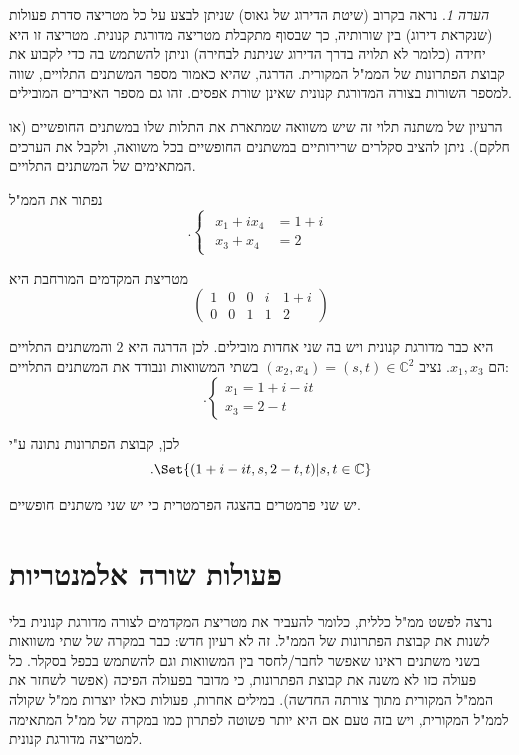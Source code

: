 \documentclass[
  hebrew,
  12pt,
  a4paper,
  oneside]{book}
\theoremstyle{definition}
\theoremstyle{remark}
\theoremstyle{plain}
\theoremstyle{remark}
\newtheorem*{remark}{הערה}
\begin{document}
\begin{remark}
נראה בקרוב (שיטת הדירוג של גאוס) שניתן לבצע על כל מטריצה סדרת פעולות
(שנקראת דירוג) בין שורותיה, כך שבסוף מתקבלת מטריצה מדורגת קנונית. מטריצה
זו היא יחידה (כלומר לא תלויה בדרך הדירוג שניתנת לבחירה) וניתן להשתמש בה
כדי לקבוע את קבוצת הפתרונות של הממ"ל המקורית. הדרגה, שהיא כאמור מספר
המשתנים התלויים, שווה למספר השורות בצורה המדורגת קנונית שאינן שורת
אפסים. זהו גם מספר האיברים המובילים.
\end{remark}

הרעיון של משתנה תלוי זה שיש משוואה שמתארת את התלות שלו במשתנים החופשיים
(או חלקם). ניתן להציב סקלרים שרירותיים במשתנים החופשיים בכל משוואה,
ולקבל את הערכים המתאימים של המשתנים התלויים.

\begin{example}

נפתור את הממ"ל \[.\begin{cases}
\begin{aligned}
x_1+ix_4&=1+i\\
x_3+x_4&=2
\end{aligned}
\end{cases}\]

מטריצת המקדמים המורחבת היא \[\left( \begin{array}{cccc|c}
    1 & 0 & 0 & i & 1+i\\
    0 & 0 & 1 & 1 & 2
\end{array} \right)\]

היא כבר מדורגת קנונית ויש בה שני אחדות מובילים. לכן הדרגה היא \(2\)
והמשתנים התלויים הם \(x_1,x_3\). נציב
\((x_2,x_4)=(s,t)\in\mathbb C^{2}\) בשתי המשוואות ונבודד את המשתנים
התלויים: \[.\begin{cases}
x_1=1+i-it\\
x_3=2-t
\end{cases}\]

לכן, קבוצת הפתרונות נתונה ע"י
\[.\Set{(1+i-it,s,2-t,t)|s,t\in\mathbb C}\]

יש שני פרמטרים בהצגה הפרמטרית כי יש שני משתנים חופשיים.

\end{example}

\section{פעולות שורה
אלמנטריות}\label{ux5e4ux5e2ux5d5ux5dcux5d5ux5ea-ux5e9ux5d5ux5e8ux5d4-ux5d0ux5dcux5deux5e0ux5d8ux5e8ux5d9ux5d5ux5ea}

נרצה לפשט ממ"ל כללית, כלומר להעביר את מטריצת המקדמים לצורה מדורגת קנונית
בלי לשנות את קבוצת הפתרונות של הממ"ל. זה לא רעיון חדש: כבר במקרה של שתי
משוואות בשני משתנים ראינו שאפשר לחבר/לחסר בין המשוואות וגם להשתמש בכפל
בסקלר. כל פעולה כזו לא משנה את קבוצת הפתרונות, כי מדובר בפעולה הפיכה
(אפשר לשחזר את הממ"ל המקורית מתוך צורתה החדשה). במילים אחרות, פעולות
כאלו יוצרות ממ"ל שקולה לממ"ל המקורית, ויש בזה טעם אם היא יותר פשוטה
לפתרון כמו במקרה של ממ"ל המתאימה למטריצה מדורגת קנונית.
\end{document}
